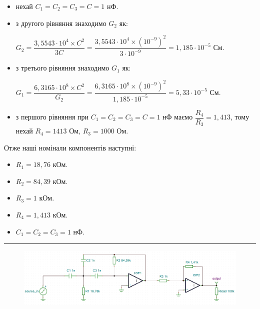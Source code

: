 \documentclass[14pt,a4paper]{scrartcl}
\begin{document}
\begin{itemize}
\item нехай $C_1=C_2=C_3=C=1$ нФ.
\item з другого рівняння знаходимо $G_2$ як:
\begin{center}
$G_2=\dfrac{3,5543\cdot{10^4}\times C^2}{3C}=\dfrac{3,5543\cdot{10^4}\times \left(10^{-9}\right)^2}{3\cdot{10^{-9}}}=1,185\cdot{10^{-5}}$ См.
\end{center}
\item з третього рівняння знаходимо $G_1$ як:
\begin{center}
$G_1=\dfrac{6,3165\cdot{10^8}\times{C^2}}{G_2}=\dfrac{6,3165\cdot{10^8}\times{\left(10^{-9}\right)^2}}{1,185\cdot{10^{-5}}}=5,33\cdot{10^{-5}}$ См.
\end{center}
\item з першого рівняння при $C_1=C_2=C_3=C=1$ нФ маємо $\dfrac{R_4}{R_3}=1,413$, тому нехай $R_4=1413$ Ом, $R_3=1000$ Ом.
\end{itemize}
\newpage
Отже наші номінали компонентів наступні:
\begin{itemize}
\item $R_1=18,76$ кОм.
\item $R_2=84,39$ кОм.
\item $R_3=1$ кОм.
\item $R_4=1,413$ кОм.
\item $C_1=C_2=C_3=1$ нФ.
\end{itemize}
\medskip\hrule\medskip
\begin{figure}[!h]
%
           {\includegraphics[width=\textwidth]{rauh1}}
\end{figure}
\end{document}

